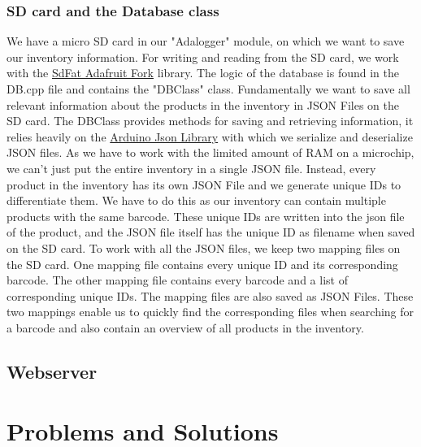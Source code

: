\documentclass{article}
\begin{document}
\subsubsection{SD card and the Database class}
We have a micro SD card in our "Adalogger" module, on which we want to save our inventory information.
For writing and reading from the SD card, we work with the \href{https://github.com/adafruit/SdFat}{SdFat Adafruit Fork} library.
The logic of the database is found in the DB.cpp file and contains the "DBClass" class. Fundamentally we want to save all relevant information about the products in the inventory in JSON Files on the SD card.
The DBClass provides methods for saving and retrieving information, it relies heavily on the \href{https://github.com/bblanchon/ArduinoJson}{Arduino Json Library} with which we serialize and deserialize JSON files.
As we have to work with the limited amount of RAM on a microchip, we can't just put the entire inventory in a single JSON file.
Instead, every product in the inventory has its own JSON File and we generate unique IDs to differentiate them. We have to do this as our inventory can contain multiple products with the same barcode.
These unique IDs are written into the json file of the product, and the JSON file itself has the unique ID as filename when saved on the SD card.
To work with all the JSON files, we keep two mapping files on the SD card. One mapping file contains every unique ID and its corresponding barcode.
The other mapping file contains every barcode and a list of corresponding unique IDs. The mapping files are also saved as JSON Files.
These two mappings enable us to quickly find the corresponding files when searching for a barcode and also contain an overview of all products in the inventory.
\subsection{Webserver}

\section{Problems and Solutions}
\end{document}
